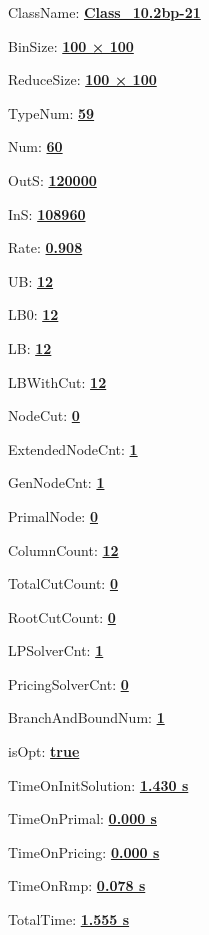 \documentclass[11pt]{article}
\begin{document}
\pagestyle{empty}


ClassName: \underline{\textbf{Class_10.2bp-21}}
\par
BinSize: \underline{\textbf{100 × 100}}
\par
ReduceSize: \underline{\textbf{100 × 100}}
\par
TypeNum: \underline{\textbf{59}}
\par
Num: \underline{\textbf{60}}
\par
OutS: \underline{\textbf{120000}}
\par
InS: \underline{\textbf{108960}}
\par
Rate: \underline{\textbf{0.908}}
\par
UB: \underline{\textbf{12}}
\par
LB0: \underline{\textbf{12}}
\par
LB: \underline{\textbf{12}}
\par
LBWithCut: \underline{\textbf{12}}
\par
NodeCut: \underline{\textbf{0}}
\par
ExtendedNodeCnt: \underline{\textbf{1}}
\par
GenNodeCnt: \underline{\textbf{1}}
\par
PrimalNode: \underline{\textbf{0}}
\par
ColumnCount: \underline{\textbf{12}}
\par
TotalCutCount: \underline{\textbf{0}}
\par
RootCutCount: \underline{\textbf{0}}
\par
LPSolverCnt: \underline{\textbf{1}}
\par
PricingSolverCnt: \underline{\textbf{0}}
\par
BranchAndBoundNum: \underline{\textbf{1}}
\par
isOpt: \underline{\textbf{true}}
\par
TimeOnInitSolution: \underline{\textbf{1.430 s}}
\par
TimeOnPrimal: \underline{\textbf{0.000 s}}
\par
TimeOnPricing: \underline{\textbf{0.000 s}}
\par
TimeOnRmp: \underline{\textbf{0.078 s}}
\par
TotalTime: \underline{\textbf{1.555 s}}
\par
\newpage


\end{document}
